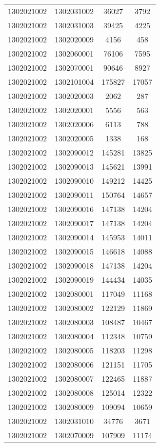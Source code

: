 \begin{longtable}[h]{llcc}
		1302021002 & 1302031002 & 36027 & 3792\\
		1302021002 & 1302031003 & 39425 & 4225\\
		1302021002 & 1302020009 & 4156 & 458\\
		1302021002 & 1302060001 & 76106 & 7595\\
		1302021002 & 1302070001 & 90646 & 8927\\
		1302021002 & 1302101004 & 175827 & 17057\\
		1302021002 & 1302020003 & 2062 & 287\\
		1302021002 & 1302020001 & 5556 & 563\\
		1302021002 & 1302020006 & 6113 & 788\\
		1302021002 & 1302020005 & 1338 & 168\\
		1302021002 & 1302090012 & 145281 & 13825\\
		1302021002 & 1302090013 & 145621 & 13991\\
		1302021002 & 1302090010 & 149212 & 14425\\
		1302021002 & 1302090011 & 150764 & 14657\\
		1302021002 & 1302090016 & 147138 & 14204\\
		1302021002 & 1302090017 & 147138 & 14204\\
		1302021002 & 1302090014 & 145953 & 14011\\
		1302021002 & 1302090015 & 146618 & 14088\\
		1302021002 & 1302090018 & 147138 & 14204\\
		1302021002 & 1302090019 & 144434 & 14035\\
		1302021002 & 1302080001 & 117049 & 11168\\
		1302021002 & 1302080002 & 122129 & 11869\\
		1302021002 & 1302080003 & 108487 & 10467\\
		1302021002 & 1302080004 & 112348 & 10759\\
		1302021002 & 1302080005 & 118203 & 11298\\
		1302021002 & 1302080006 & 121151 & 11705\\
		1302021002 & 1302080007 & 122465 & 11887\\
		1302021002 & 1302080008 & 125014 & 12322\\
		1302021002 & 1302080009 & 109094 & 10659\\
		1302021002 & 1302031010 & 34776 & 3671\\
		1302021002 & 1302070009 & 107909 & 11174\\

\end{longtable}
